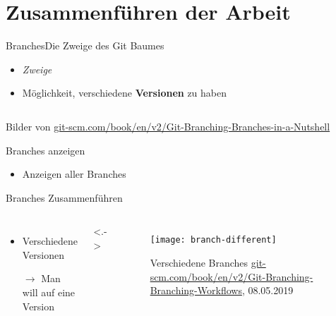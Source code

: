 \documentclass[xcolor=dvipsnames]{beamer}
\begin{document}
  \section[Merge]{Zusammenführen der Arbeit}


    \begin{frame}{Branches}{Die Zweige des Git Baumes}
      \begin{itemize}
        \item<+-> \textit{Zweige}
        \item<+-> Möglichkeit, verschiedene \textbf{Versionen} zu haben
      \end{itemize}
      \begin{columns}
       \end{columns}
      \tiny{Bilder von \url{git-scm.com/book/en/v2/Git-Branching-Branches-in-a-Nutshell}}
    \end{frame}

    \begin{frame}{Branches anzeigen}
      \begin{itemize}
        \item<+-> Anzeigen aller Branches
      \end{itemize}
    \end{frame}

    \begin{frame}{Branches Zusammenführen}
      \begin{columns}
          \begin{itemize}[<+->]
            \item Verschiedene Versionen
            \item[$\rightarrow$] Man will auf eine Version
          \end{itemize}

          \onslide<.->{
            \begin{figure}
              \texttt{[image: branch-different]}
              \caption{Verschiedene Branches \tiny{\url{git-scm.com/book/en/v2/Git-Branching-Branching-Workflows}, 08.05.2019}}
            \end{figure}
          }
      \end{columns}
    \end{frame}
\end{document}
